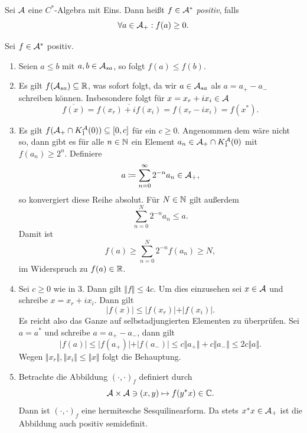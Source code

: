 \begin{definition}
    Sei $\mathcal{A}$ eine $C^*$-Algebra mit Eins. Dann heißt $f \in \mathcal{A}^*$ \emph{positiv}, falls
    $$ \forall a \in \mathcal{A}_+ : f(a) \geq 0. $$
\end{definition}

\begin{remark}
    Sei $f \in \mathcal{A}^*$ positiv.
    \begin{enumerate}
        \item Seien $a \leq b$ mit $a, b \in \mathcal{A}_{sa}$, so folgt $f(a) \leq f(b)$.

        \item Es gilt $f(\mathcal{A}_{sa}) \subseteq \mathbb{R}$, was sofort folgt, da wir $a \in \mathcal{A}_{sa}$ als $a = a_+ - a_-$ schreiben können. Insbesondere folgt für $x = x_r + i x_i \in \mathcal{A}$
        $$ \overline{f(x)} = \overline{f(x_r) + i f(x_i)} = f(x_r - i x_i) = f(x^*). $$

        \item Es gilt $f(\mathcal{A}_+ \cap K_1^{\mathcal{A}}(0)) \subseteq [0, c]$ für ein $c \geq 0$. Angenommen dem wäre nicht so, dann gibt es für alle $n \in \mathbb{N}$ ein Element $a_n \in \mathcal{A}_+ \cap K_1^{\mathcal{A}}(0)$ mit $f(a_n) \geq 2^n$. Definiere
        $$ a \coloneqq \sum_{n=0}^\infty 2^{-n} a_n \in \mathcal{A}_+, $$
        so konvergiert diese Reihe absolut. Für $N \in \mathbb{N}$ gilt außerdem
        $$ \sum_{n=0}^N 2^{-n} a_n \leq a. $$
        Damit ist
        $$ f(a) \geq \sum_{n=0}^N 2^{-n} f(a_n) \geq N, $$
        im Widerspruch zu $f(a) \in \mathbb{R}$.

        \item Sei $c \geq 0$ wie in 3. Dann gilt $\Vert f \Vert \leq 4 c$. Um dies einzusehen sei $x \in \mathcal{A}$ und schreibe $x = x_r + i x_i$. Dann gilt
        $$ \vert f(x) \vert \leq \vert f(x_r) \vert + \vert f(x_i) \vert. $$
        Es reicht also das Ganze auf selbstadjungierten Elementen zu überprüfen. Sei $a = a^*$ und schreibe $a = a_+ - a_-$, dann gilt
        $$ \vert f(a) \vert \leq \vert f(a_+) \vert + \vert f(a_-) \vert \leq c \Vert a_+ \Vert + c \Vert a_- \Vert \leq 2c \Vert a \Vert. $$
        Wegen $\Vert x_r \Vert, \Vert x_i \Vert \leq \Vert x \Vert$ folgt die Behauptung.

        \item Betrachte die Abbildung $(\cdot, \cdot)_f$ definiert durch
        $$ \mathcal{A} \times \mathcal{A} \ni (x, y) \mapsto f(y^* x) \in \mathbb{C}. $$
        Dann ist $(\cdot, \cdot)_f$ eine hermitesche Sesquilinearform. Da stets $x^* x \in \mathcal{A}_+$ ist die Abbildung auch positiv semidefinit.


\end{enumerate}
\end{remark}
